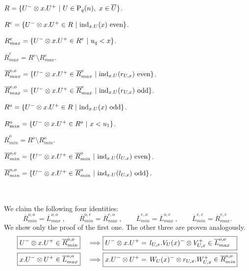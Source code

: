 \begin{minipage}{.8\textwidth}
	$R = \{U^-\otimes x.U^+\ | \ U \in \mathrm{P}_q(n),\ x \in \overline{U}\}$.\\
	\begin{tab}
		$R^{e} = \{U^-\tensor x.U^+ \in R\ | \ \ind_{x.U}(x) \text{ even}\}$.\par
		\begin{tab}
			$R_{max}^{e} = \{U^- \tensor x.U^+ \in R^e\ | \ u_q < x \}$.\par 
			$\overline{R}_{max}^{e} = R^{e} \setminus R_{max}^{e}$.
			\begin{tab}
				$\overline{R}_{max}^{e,e} = \{ U^- \otimes x.U^+ \in \overline{R}_{max}^{e}\ | \ \mathrm{ind}_{x.U}(r_{U,x}) \text{ even} \}$.\par 
				$\overline{R}_{max}^{e,o} = \{ U^- \otimes x.U^+ \in \overline{R}_{max}^{e}\ | \ \mathrm{ind}_{x.U}(r_{U,x}) \text{ odd} \}$.\\
			\end{tab}
		\end{tab}
		$R^{o} = \{U^- \tensor x.U^+ \in R\ | \ \ind_{x.U}(x) \text{ odd}\}$.\par 
		\begin{tab}
			$R_{min}^{o} = \{U^- \otimes x.U^+ \in R^o \ | \  x < u_1 \}$.\par 
			$\overline{R}_{min}^{o} = R^{o} \setminus R_{min}^{o}$.
			\begin{tab}
				$\overline{R}_{min}^{o,e} = \{ U^- \otimes x.U^+ \in \overline{R}_{min}^{o}\ | \ \mathrm{ind}_{x.U}(l_{U,x}) \text{ even} \}$.\par 
				$\overline{R}_{min}^{o,o} = \{ U^- \otimes x.U^+ \in \overline{R}_{min}^{o}\ | \ \mathrm{ind}_{x.U}(l_{U,x}) \text{ odd} \}$.
			\end{tab}
		\end{tab}
	\end{tab}
\end{minipage} \\ \\
We claim the following four identities: 
\begin{equation}\label{lemma4: existence: eq2}
\overline{R}_{min}^{o,o} = \overline{L}_{max}^{o,o}\ , \qquad \overline{R}_{min}^{o,e} = \overline{R}_{max}^{e,o}\ , \qquad 
\overline{L}_{min}^{e,o} = \overline{L}_{max}^{o,e}\ , \qquad \overline{L}_{min}^{e,e} = \overline{R}_{max}^{e,e}.
\end{equation}
We show only the proof of the first one. The other three are proven analogously.
\begin{alignat*}{2}
&\boxed{U^-\tensor x.U^+ \in \overline{R}_{min}^{o,o}}\ &\Longrightarrow\ &\boxed{U^-\tensor x.U^+ =\, l_{U,x}.V_U(x)^-\tensor V_{U,x}^+ \in \overline{L}_{max}^{o,o} \ \ } \\ 
&\boxed{x.U^-\tensor U^+ \in \overline{L}_{max}^{o,o}}\ &\Longrightarrow\ &\boxed{x.U^-\tensor U^+ =\, W_U(x)^-\tensor r_{U,x}.W_{U,x}^+ \in \overline{R}_{min}^{o,o} \! }
\end{alignat*}
